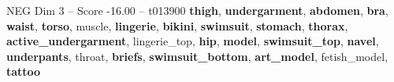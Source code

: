\begin{textsample}{NEG Dim 3 – Score -16.00 – t013900}  \label{ex:f3_neg_024}
\textbf{thigh}, \textbf{undergarment}, \textbf{abdomen}, \textbf{bra}, \textbf{waist}, \textbf{torso}, muscle, \textbf{lingerie}, \textbf{bikini}, \textbf{swimsuit}, \textbf{stomach}, \textbf{thorax}, \textbf{active\_undergarment}, lingerie\_top, \textbf{hip}, \textbf{model}, \textbf{swimsuit\_top}, \textbf{navel}, \textbf{underpants}, throat, \textbf{briefs}, \textbf{swimsuit\_bottom}, \textbf{art\_model}, fetish\_model, \textbf{tattoo}

\end{textsample}

